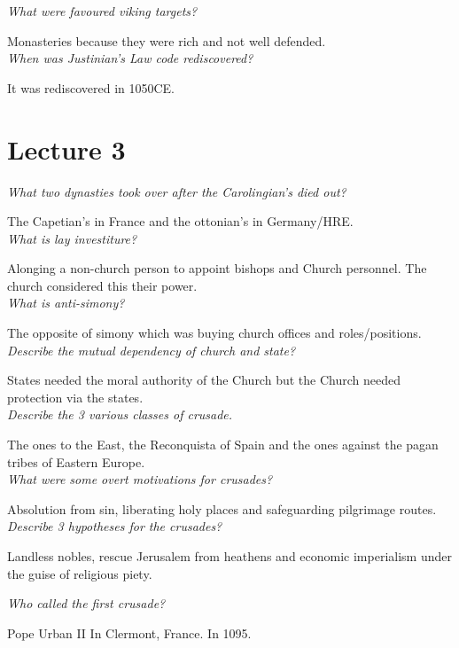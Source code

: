 \documentclass[12pt]{article}
\begin{document}
\textit{What were favoured viking targets?}

Monasteries because they were rich and not well defended.\\

\textit{When was Justinian's Law code rediscovered?}

It was rediscovered in 1050CE. \\

\section*{Lecture 3}

\textit{What two dynasties took over after the Carolingian's died out?}

The Capetian's in France and the ottonian's in Germany/HRE.\\

\textit{What is lay investiture?}

Alonging a non-church person to appoint bishops and Church personnel. The church considered this their power.\\

\textit{What is anti-simony?}

The opposite of simony which was buying church offices and roles/positions.\\

\textit{Describe the mutual dependency of church and state?}

States needed the moral authority of the Church but the Church needed protection via the states.\\

\textit{Describe the 3 various classes of crusade.}

The ones to the East, the Reconquista of Spain and the ones against the pagan tribes of Eastern Europe.\\

\textit{What were some overt motivations for crusades?}

Absolution from sin, liberating holy places and safeguarding pilgrimage routes.\\

\textit{Describe 3 hypotheses for the crusades?}

Landless nobles, rescue Jerusalem from heathens and economic imperialism under the guise of religious piety.

\textit{Who called the first crusade?}

Pope Urban II In Clermont, France. In 1095.\\
\end{document}
